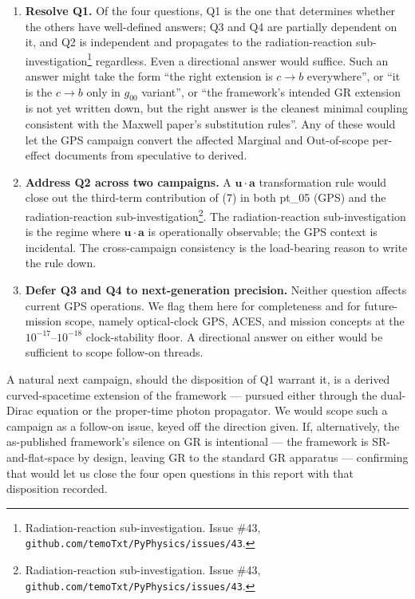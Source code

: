 \documentclass[
  11pt,
]{article}
\begin{document}
\begin{enumerate}
\def\labelenumi{\arabic{enumi}.}
\item
  \textbf{Resolve Q1.} Of the four questions, Q1 is the one that
  determines whether the others have well-defined answers; Q3 and Q4 are
  partially dependent on it, and Q2 is independent and propagates to the
  radiation-reaction sub-investigation\footnote{Radiation-reaction
    sub-investigation. Issue \#43,
    \texttt{github.com/temoTxt/PyPhysics/issues/43}.} regardless. Even a
  directional answer would suffice. Such an answer might take the form
  ``the right extension is \(c \to b\) everywhere'', or ``it is the
  \(c \to b\) only in \(g_{00}\) variant'', or ``the framework's
  intended GR extension is not yet written down, but the right answer is
  the cleanest minimal coupling consistent with the Maxwell paper's
  substitution rules''. Any of these would let the GPS campaign convert
  the affected Marginal and Out-of-scope per-effect documents from
  speculative to derived.
\item
  \textbf{Address Q2 across two campaigns.} A
  \(\mathbf{u} \cdot \mathbf{a}\) transformation rule would close out
  the third-term contribution of (7) in both pt\_05 (GPS) and the
  radiation-reaction sub-investigation\footnote{Radiation-reaction
    sub-investigation. Issue \#43,
    \texttt{github.com/temoTxt/PyPhysics/issues/43}.}. The
  radiation-reaction sub-investigation is the regime where
  \(\mathbf{u} \cdot \mathbf{a}\) is operationally observable; the GPS
  context is incidental. The cross-campaign consistency is the
  load-bearing reason to write the rule down.
\item
  \textbf{Defer Q3 and Q4 to next-generation precision.} Neither
  question affects current GPS operations. We flag them here for
  completeness and for future-mission scope, namely optical-clock GPS,
  ACES, and mission concepts at the \(10^{-17}\)--\(10^{-18}\)
  clock-stability floor. A directional answer on either would be
  sufficient to scope follow-on threads.
\end{enumerate}

A natural next campaign, should the disposition of Q1 warrant it, is a
derived curved-spacetime extension of the framework --- pursued either
through the dual-Dirac equation or the proper-time photon propagator. We
would scope such a campaign as a follow-on issue, keyed off the
direction given. If, alternatively, the as-published framework's silence
on GR is intentional --- the framework is SR-and-flat-space by design,
leaving GR to the standard GR apparatus --- confirming that would let us
close the four open questions in this report with that disposition
recorded.
\end{document}
